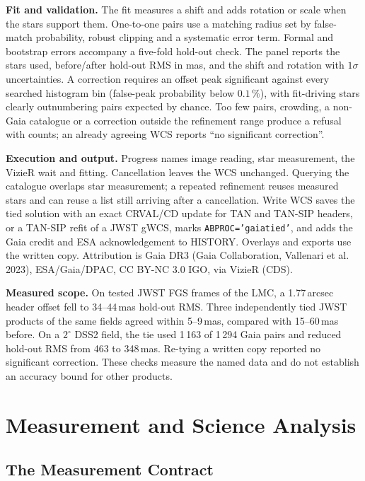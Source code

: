 \documentclass[11pt,a4paper]{article}
\newcommand{\code}[1]{\texttt{\small #1}}
\begin{document}
    \textbf{Fit and validation.} The fit measures a shift and adds rotation or scale when the stars support them. One-to-one pairs use a matching radius set by false-match probability, robust clipping and a systematic error term. Formal and bootstrap errors accompany a five-fold hold-out check. The panel reports the stars used, before/after hold-out RMS in mas, and the shift and rotation with $1\sigma$ uncertainties. A correction requires an offset peak significant against every searched histogram bin (false-peak probability below $0.1\,\%$), with fit-driving stars clearly outnumbering pairs expected by chance. Too few pairs, crowding, a non-Gaia catalogue or a correction outside the refinement range produce a refusal with counts; an already agreeing WCS reports ``no significant correction''.

    \textbf{Execution and output.} Progress names image reading, star measurement, the VizieR wait and fitting. Cancellation leaves the WCS unchanged. Querying the catalogue overlaps star measurement; a repeated refinement reuses measured stars and can reuse a list still arriving after a cancellation. Write WCS saves the tied solution with an exact CRVAL/CD update for TAN and TAN-SIP headers, or a TAN-SIP refit of a JWST gWCS, marks \code{ABPROC='gaiatied'}, and adds the Gaia credit and ESA acknowledgement to HISTORY. Overlays and exports use the written copy. Attribution is Gaia DR3 (Gaia Collaboration, Vallenari et al. 2023), ESA/Gaia/DPAC, CC BY-NC 3.0 IGO, via VizieR (CDS).

    \textbf{Measured scope.} On tested JWST FGS frames of the LMC, a 1.77\,arcsec header offset fell to 34--44\,mas hold-out RMS. Three independently tied JWST products of the same fields agreed within 5--9\,mas, compared with 15--60\,mas before. On a $2^{\circ}$ DSS2 field, the tie used 1\,163 of 1\,294 Gaia pairs and reduced hold-out RMS from 463 to 348\,mas. Re-tying a written copy reported no significant correction. These checks measure the named data and do not establish an accuracy bound for other products.

    \section{Measurement and Science Analysis}
    \label{sec:measure}

    \subsection{The Measurement Contract}
\end{document}
